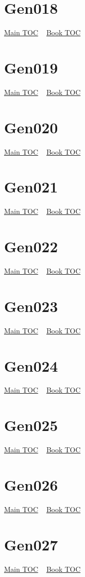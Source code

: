 \documentclass{book}
\begin{document}
  \section{Gen018}\hyperlink{toc}{Main TOC} ~ \hyperref[subsec:Gen]{Book TOC} 
  \section{Gen019}\hyperlink{toc}{Main TOC} ~ \hyperref[subsec:Gen]{Book TOC} 
  \section{Gen020}\hyperlink{toc}{Main TOC} ~ \hyperref[subsec:Gen]{Book TOC} 
  \section{Gen021}\hyperlink{toc}{Main TOC} ~ \hyperref[subsec:Gen]{Book TOC} 
  \section{Gen022}\hyperlink{toc}{Main TOC} ~ \hyperref[subsec:Gen]{Book TOC} 
  \section{Gen023}\hyperlink{toc}{Main TOC} ~ \hyperref[subsec:Gen]{Book TOC} 
  \section{Gen024}\hyperlink{toc}{Main TOC} ~ \hyperref[subsec:Gen]{Book TOC} 
  \section{Gen025}\hyperlink{toc}{Main TOC} ~ \hyperref[subsec:Gen]{Book TOC} 
  \section{Gen026}\hyperlink{toc}{Main TOC} ~ \hyperref[subsec:Gen]{Book TOC} 
  \section{Gen027}\hyperlink{toc}{Main TOC} ~ \hyperref[subsec:Gen]{Book TOC} 
\end{document}
